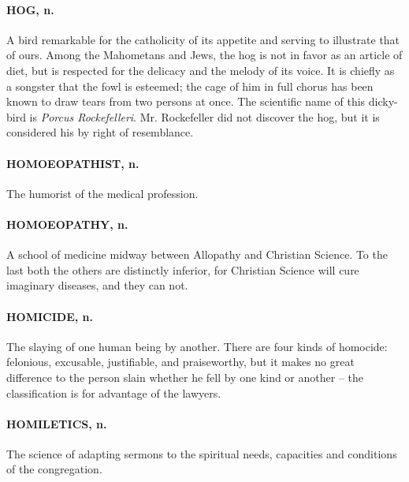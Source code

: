 \documentclass[11pt]{article}
\begin{document}
\paragraph{HOG, n.}  A bird remarkable for the catholicity of its appetite and
serving to illustrate that of ours.  Among the Mahometans and Jews,
the hog is not in favor as an article of diet, but is respected for
the delicacy and the melody of its voice.  It is chiefly as a songster
that the fowl is esteemed; the cage of him in full chorus has been
known to draw tears from two persons at once.  The scientific name of
this dicky-bird is {\em Porcus Rockefelleri}.  Mr. Rockefeller did not
discover the hog, but it is considered his by right of resemblance.

\paragraph{HOMOEOPATHIST, n.}  The humorist of the medical profession.

\paragraph{HOMOEOPATHY, n.}  A school of medicine midway between Allopathy and
Christian Science.  To the last both the others are distinctly
inferior, for Christian Science will cure imaginary diseases, and they
can not.

\paragraph{HOMICIDE, n.}  The slaying of one human being by another.  There are
four kinds of homocide:  felonious, excusable, justifiable, and
praiseworthy, but it makes no great difference to the person slain
whether he fell by one kind or another -- the classification is for
advantage of the lawyers.

\paragraph{HOMILETICS, n.}  The science of adapting sermons to the spiritual
needs, capacities and conditions of the congregation.
\end{document}
